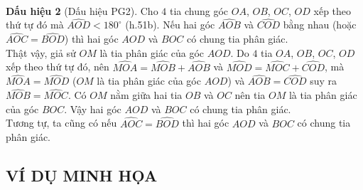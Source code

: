 \begin{enumerate}
\begin{minipage}{0.45\textwidth}
	\end{minipage}\\
	\textbf{Dấu hiệu 2} (Dấu hiệu PG2). Cho $ 4 $ tia chung góc $ OA $, $ OB $, $ OC $, $ OD $ xếp theo thứ tự đó mà $ \widehat{AOD}<180^\circ $ (h.51b). Nếu hai góc $ \widehat{AOB} $ và $ \widehat{COD} $ bằng nhau (hoặc $ \widehat{AOC}=\widehat{BOD} $) thì hai góc $ AOD $ và $ BOC $ có chung tia phân giác.\\
	Thật vậy, giả sử $ OM $ là tia phân giác của góc $ AOD $. Do $ 4 $ tia $ OA $, $ OB $, $ OC $, $ OD $ xếp theo thứ tự đó, nên $ \widehat{MOA}=\widehat{MOB}+\widehat{AOB} $ và $ \widehat{MOD}=\widehat{MOC}+\widehat{COD} $, mà $ \widehat{MOA}=\widehat{MOD} $ ($ OM $ là tia phân giác của góc $ AOD $) và $ \widehat{AOB}=\widehat{COD} $ suy ra $ \widehat{MOB}=\widehat{MOC} $. Có $ OM $ nằm giữa hai tia $ OB $ và $ OC $ nên tia $ OM $ là tia phân giác của góc $ BOC $. Vậy hai góc $ AOD $ và $ BOC $ có chung tia phân giác.\\
	Tương tự, ta cũng có nếu $ \widehat{AOC}=\widehat{BOD} $ thì hai góc $ AOD $ và $ BOC $ có chung tia phân giác.
\end{enumerate}

\subsection{VÍ DỤ MINH HỌA}

